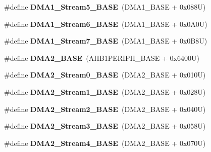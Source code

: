 \begin{DoxyCompactItemize}
\#define {\bfseries D\+M\+A1\+\_\+\+Stream5\+\_\+\+B\+A\+SE}~(D\+M\+A1\+\_\+\+B\+A\+SE + 0x088\+U)
\item 
\mbox{\label{group___peripheral__memory__map_ga58998ddc40adb6361704d6c9dad08125}} 
\#define {\bfseries D\+M\+A1\+\_\+\+Stream6\+\_\+\+B\+A\+SE}~(D\+M\+A1\+\_\+\+B\+A\+SE + 0x0\+A0\+U)
\item 
\mbox{\label{group___peripheral__memory__map_ga82186dd6d3f60995d428b34c041919d7}} 
\#define {\bfseries D\+M\+A1\+\_\+\+Stream7\+\_\+\+B\+A\+SE}~(D\+M\+A1\+\_\+\+B\+A\+SE + 0x0\+B8\+U)
\item 
\mbox{\label{group___peripheral__memory__map_gab72a9ae145053ee13d1d491fb5c1df64}} 
\#define {\bfseries D\+M\+A2\+\_\+\+B\+A\+SE}~(A\+H\+B1\+P\+E\+R\+I\+P\+H\+\_\+\+B\+A\+SE + 0x6400\+U)
\item 
\mbox{\label{group___peripheral__memory__map_gac4c67b24726ba6b94d03adb351bcec4d}} 
\#define {\bfseries D\+M\+A2\+\_\+\+Stream0\+\_\+\+B\+A\+SE}~(D\+M\+A2\+\_\+\+B\+A\+SE + 0x010\+U)
\item 
\mbox{\label{group___peripheral__memory__map_ga35512bdc3f5e9df4557c2fbe7935d0b1}} 
\#define {\bfseries D\+M\+A2\+\_\+\+Stream1\+\_\+\+B\+A\+SE}~(D\+M\+A2\+\_\+\+B\+A\+SE + 0x028\+U)
\item 
\mbox{\label{group___peripheral__memory__map_gaed33a06f08188466f2ede06160984e9a}} 
\#define {\bfseries D\+M\+A2\+\_\+\+Stream2\+\_\+\+B\+A\+SE}~(D\+M\+A2\+\_\+\+B\+A\+SE + 0x040\+U)
\item 
\mbox{\label{group___peripheral__memory__map_gaf3a9480e08c6ae94f4482e0cdaebdd17}} 
\#define {\bfseries D\+M\+A2\+\_\+\+Stream3\+\_\+\+B\+A\+SE}~(D\+M\+A2\+\_\+\+B\+A\+SE + 0x058\+U)
\item 
\mbox{\label{group___peripheral__memory__map_gad1e67740e6301233473f64638145dd1f}} 
\#define {\bfseries D\+M\+A2\+\_\+\+Stream4\+\_\+\+B\+A\+SE}~(D\+M\+A2\+\_\+\+B\+A\+SE + 0x070\+U)
\item 

\end{DoxyCompactItemize}
